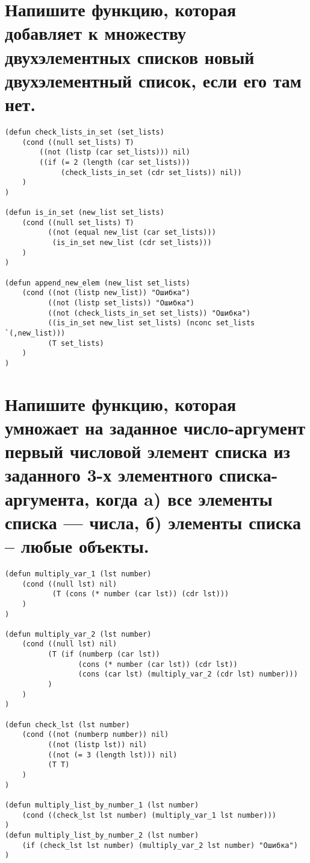 \section{Напишите функцию, которая добавляет к множеству двухэлементных списков новый двухэлементный список, если его там нет.}
\begin{lstlisting}[basicstyle=\footnotesize, caption=Задание 7]
(defun check_lists_in_set (set_lists)
	(cond ((null set_lists) T)
		((not (listp (car set_lists))) nil)
		((if (= 2 (length (car set_lists))) 
		     (check_lists_in_set (cdr set_lists)) nil))
	)
)

(defun is_in_set (new_list set_lists)
	(cond ((null set_lists) T)
		  ((not (equal new_list (car set_lists))) 
		   (is_in_set new_list (cdr set_lists)))
	)
)

(defun append_new_elem (new_list set_lists)
	(cond ((not (listp new_list)) "Ошибка")
		  ((not (listp set_lists)) "Ошибка")
 		  ((not (check_lists_in_set set_lists)) "Ошибка")
		  ((is_in_set new_list set_lists) (nconc set_lists `(,new_list)))
		  (T set_lists)
	)
)
\end{lstlisting}

\section{Напишите функцию, которая умножает на заданное число-аргумент первый числовой элемент списка из заданного 3-х элементного списка- аргумента, когда
	a) все элементы списка --- числа,
	б) элементы списка -- любые объекты.}
\begin{lstlisting}[basicstyle=\footnotesize, caption=Задание 8]
(defun multiply_var_1 (lst number)
	(cond ((null lst) nil)
		   (T (cons (* number (car lst)) (cdr lst)))
	)
)

(defun multiply_var_2 (lst number)
	(cond ((null lst) nil)
		  (T (if (numberp (car lst))
				 (cons (* number (car lst)) (cdr lst)) 
				 (cons (car lst) (multiply_var_2 (cdr lst) number)))
		  )
	)
)

(defun check_lst (lst number)
	(cond ((not (numberp number)) nil)
		  ((not (listp lst)) nil)
		  ((not (= 3 (length lst))) nil)
		  (T T)
	)
)

(defun multiply_list_by_number_1 (lst number)
	(cond ((check_lst lst number) (multiply_var_1 lst number)))
)
(defun multiply_list_by_number_2 (lst number)
	(if (check_lst lst number) (multiply_var_2 lst number) "Ошибка")
)
\end{lstlisting}

